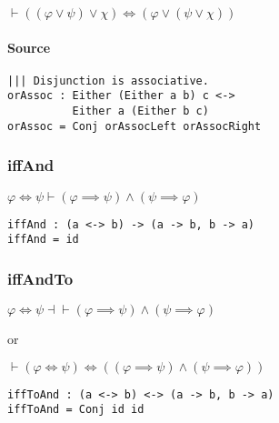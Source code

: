\documentclass{acm_proc_article-sp}
\begin{document}
\(\vdash ((\varphi \lor \psi) \lor \chi) \iff (\varphi \lor (\psi \lor \chi))\)

\paragraph{Source}\label{source-3}

\begin{verbatim}
||| Disjunction is associative.
orAssoc : Either (Either a b) c <->
          Either a (Either b c)
orAssoc = Conj orAssocLeft orAssocRight
\end{verbatim}

\subsubsection{iffAnd}\label{iffand}

\(\varphi \iff \psi \vdash (\varphi \implies \psi) \land (\psi \implies \varphi)\)

\begin{verbatim}
iffAnd : (a <-> b) -> (a -> b, b -> a)
iffAnd = id
\end{verbatim}

\subsubsection{iffAndTo}\label{iffandto}

\(\varphi \iff \psi \dashv\vdash (\varphi \implies \psi) \land (\psi \implies \varphi)\)

or

\(\vdash (\varphi \iff \psi) \iff ((\varphi \implies \psi) \land (\psi \implies \varphi))\)

\begin{verbatim}
iffToAnd : (a <-> b) <-> (a -> b, b -> a)
iffToAnd = Conj id id
\end{verbatim}

\balancecolumns
\end{document}
